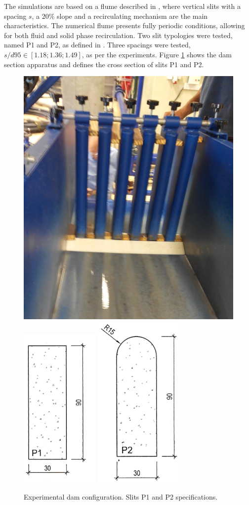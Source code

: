 The simulations are based on a flume described in \cite{Silva-2015}, where vertical slits with a spacing $s$, a $20\%$ slope and a recirculating mechanism are the main characteristics. The numerical flume presents fully periodic conditions, allowing for both fluid and solid phase recirculation. Two slit typologies were tested, named P1 and P2, as defined in \cite{Silva-2015}. Three spacings were tested, $s/d95 \in [1.18; 1.36; 1.49]$, as per the experiments. Figure \ref{fig:Slits} shows the dam section apparatus and defines the cross section of slits P1 and P2.

%
\begin{figure}[ht!]
	\centering
	\includegraphics[width=0.45\linewidth]{Figures/6.Chapter/Experimental_slits}
	\includegraphics[width=0.20\linewidth]{Figures/6.Chapter/p1_slits}
	\includegraphics[width=0.205\linewidth]{Figures/6.Chapter/p2_slits}
	\caption{Experimental dam configuration. Slits P1 and P2 specifications. \citep{Silva-2015}}
	\label{fig:Slits} 
\end{figure}
%

